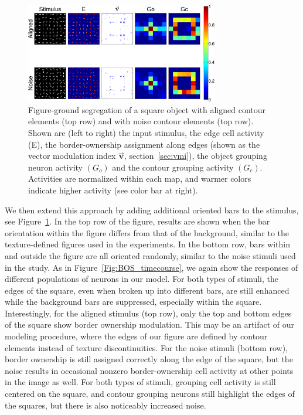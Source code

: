 \begin{figure}[t!]
\centering
\includegraphics[width=0.75\textwidth]{Contour/figs/Fig7.eps}
\makeatletter
\let\@currsize\normalsize
\caption[Figure-ground segregation in the presence of noise]{Figure-ground segregation of a square object with aligned contour elements (top row) and with noise contour elements (top row). Shown are (left to right) the input stimulus, the edge cell activity (E), the border-ownership assignment along edges (shown as the vector modulation index  $\overrightarrow{\mathbf{v}}$, section~\ref{sec:vmi}), the object grouping  neuron activity $(G_o)$ and the contour grouping activity $(G_c)$. Activities are normalized within each map, and warmer colors indicate higher activity (see color bar at right).}
\label{Fig:Square_Noise}
\end{figure}

We then extend this approach by adding additional oriented bars to the
stimulus, see Figure~\ref{Fig:Square_Noise}. In the top row of the figure, results are shown when the bar orientation within the figure differs from that of the background, similar to the texture-defined figures used in the \citet{Lamme95} experiments. In the bottom row, bars within and outside the figure are all oriented randomly, similar to the noise stimuli used in the \citet{Chen_etal14} study.  As in
Figure~\ref{Fig:BOS_timecourse}, we again show the responses of
different populations of neurons in our model.  For both types of
stimuli, the edges of the square, even when broken up into different
bars, are still enhanced while the background bars are suppressed,
especially within the square.  Interestingly, for the aligned stimulus
(top row), only the top and bottom edges of the square show border
ownership modulation. This may be an artifact of our modeling
procedure, where the edges of our figure are defined by contour elements instead of texture discontinuities. For the noise stimuli (bottom row), border ownership is still assigned correctly along the edge of the square, but the noise results in occasional nonzero border-ownership cell activity at other points in the image as well.  For both types of stimuli, grouping cell activity is still centered on the square, and contour grouping neurons still highlight the edges of the squares, but there is also noticeably increased noise.

